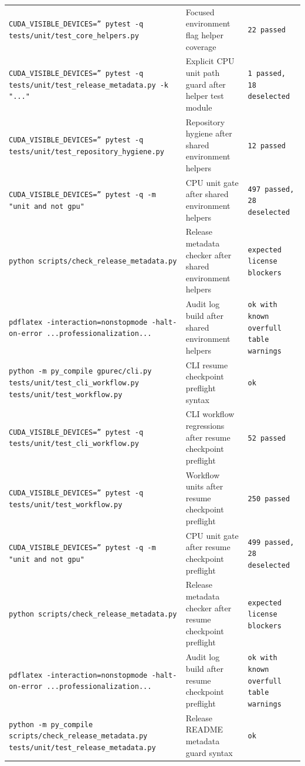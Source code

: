 \documentclass[11pt]{article}
\begin{document}
\begin{center}
\begin{tabular}{lll}
\texttt{CUDA\_VISIBLE\_DEVICES='' pytest -q tests/unit/test\_core\_helpers.py} &
Focused environment flag helper coverage &
\texttt{22 passed} \\
\texttt{CUDA\_VISIBLE\_DEVICES='' pytest -q tests/unit/test\_release\_metadata.py -k "..."} &
Explicit CPU unit path guard after helper test module &
\texttt{1 passed, 18 deselected} \\
\texttt{CUDA\_VISIBLE\_DEVICES='' pytest -q tests/unit/test\_repository\_hygiene.py} &
Repository hygiene after shared environment helpers &
\texttt{12 passed} \\
\texttt{CUDA\_VISIBLE\_DEVICES='' pytest -q -m "unit and not gpu"} &
CPU unit gate after shared environment helpers &
\texttt{497 passed, 28 deselected} \\
\texttt{python scripts/check\_release\_metadata.py} &
Release metadata checker after shared environment helpers &
\texttt{expected license blockers} \\
\texttt{pdflatex -interaction=nonstopmode -halt-on-error ...professionalization...} &
Audit log build after shared environment helpers &
\texttt{ok with known overfull table warnings} \\
\texttt{python -m py\_compile gpurec/cli.py tests/unit/test\_cli\_workflow.py tests/unit/test\_workflow.py} &
CLI resume checkpoint preflight syntax &
\texttt{ok} \\
\texttt{CUDA\_VISIBLE\_DEVICES='' pytest -q tests/unit/test\_cli\_workflow.py} &
CLI workflow regressions after resume checkpoint preflight &
\texttt{52 passed} \\
\texttt{CUDA\_VISIBLE\_DEVICES='' pytest -q tests/unit/test\_workflow.py} &
Workflow units after resume checkpoint preflight &
\texttt{250 passed} \\
\texttt{CUDA\_VISIBLE\_DEVICES='' pytest -q -m "unit and not gpu"} &
CPU unit gate after resume checkpoint preflight &
\texttt{499 passed, 28 deselected} \\
\texttt{python scripts/check\_release\_metadata.py} &
Release metadata checker after resume checkpoint preflight &
\texttt{expected license blockers} \\
\texttt{pdflatex -interaction=nonstopmode -halt-on-error ...professionalization...} &
Audit log build after resume checkpoint preflight &
\texttt{ok with known overfull table warnings} \\
\texttt{python -m py\_compile scripts/check\_release\_metadata.py tests/unit/test\_release\_metadata.py} &
Release README metadata guard syntax &
\texttt{ok} \\

\end{tabular}
\end{center}
\end{document}

